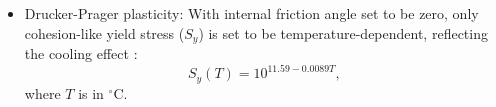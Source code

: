 \documentclass[aguposter,landscape]{baposter}
\begin{document}
\begin{poster}
{\begin{minipage}[t]{1.0\linewidth}
\begin{multicols}{2}
\begin{itemize}[leftmargin=1.5em]
\begin{itemize}[leftmargin=0.5em]
       \item Drucker-Prager plasticity: With internal friction angle set to be zero, only cohesion-like yield stress ($S_{y}$) is set to be temperature-dependent, reflecting the cooling effect \citep{Miyamoto1998}:
          \begin{equation*}
             S_{y}(T) = 10^{11.59-0.0089T},
          \end{equation*}
          where $T$ is in $^{\circ}$C.
     \end{itemize}
   \end{itemize}
   \end{multicols}
\end{minipage}
}

\end{poster}
\end{document}
